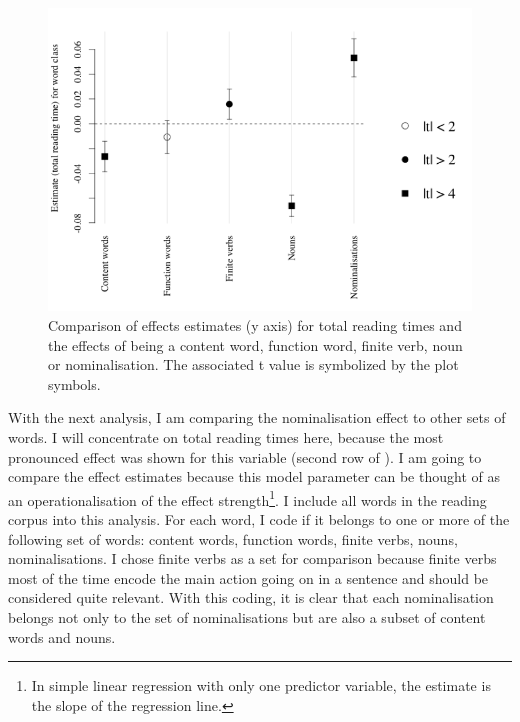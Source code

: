 \documentclass[output=paper]{langsci/langscibook}
\begin{document}
 
\begin{figure}
 \includegraphics[width=\textwidth]{figures/Wolfer1.png}
\caption{Comparison of effects estimates (y axis) for total reading times and the effects of being a content word, function word, finite verb, noun or nominalisation. The associated t value is symbolized by the plot symbols.}
 \label{wolfer:fig:1}
\end{figure} 


With the next analysis, I am comparing the nominalisation effect to other sets of words. I will concentrate on total reading times here, because the most pronounced effect was shown for this variable (second row of ). I am going to compare the effect estimates because this model parameter can be thought of as an operationalisation of the effect strength\footnote{In simple linear regression with only one predictor variable, the estimate is the slope of the regression line.}. I include all words in the reading corpus into this analysis. For each word, I code if it belongs to one or more of the following set of words: content words, function words, finite verbs, nouns, nominalisations. I chose finite verbs as a set for comparison because finite verbs most of the time encode the main action going on in a sentence and should be considered quite relevant. With this coding, it is clear that each nominalisation belongs not only to the set of nominalisations but are also a subset of content words and nouns. 
\end{document}
